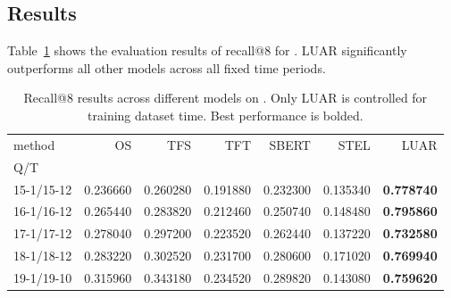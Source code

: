 \subsection{Results}
Table~\ref{tab:temporal_fixed} shows the evaluation results of recall@8 for \DSfixeddelta{}. LUAR significantly outperforms all other models across all fixed time periods.
\begin{table}[]
    \centering
\begin{tabular}{lrrrrrr}
\toprule
method & OS & TFS & TFT & SBERT & STEL & LUAR \\
Q/T &  &  &  &  &  &  \\
\midrule
15-1/15-12 & 0.236660 & 0.260280 & 0.191880 & 0.232300 & 0.135340 & \textbf{0.778740} \\
16-1/16-12 & 0.265440 & 0.283820 & 0.212460 & 0.250740 & 0.148480 & \textbf{0.795860} \\
17-1/17-12 & 0.278040 & 0.297200 & 0.223520 & 0.262440 & 0.137220 & \textbf{0.732580} \\
18-1/18-12 & 0.283220 & 0.302520 & 0.231700 & 0.280600 & 0.171020 & \textbf{0.769940} \\
19-1/19-10 & 0.315960 & 0.343180 & 0.234520 & 0.289820 & 0.143080 & \textbf{0.759620} \\
\bottomrule
\end{tabular}
    \caption{Recall@8 results across different models on \DSfixeddelta{}. Only LUAR is controlled for training dataset time. Best performance is bolded.   }
    \label{tab:temporal_fixed}
\end{table}



